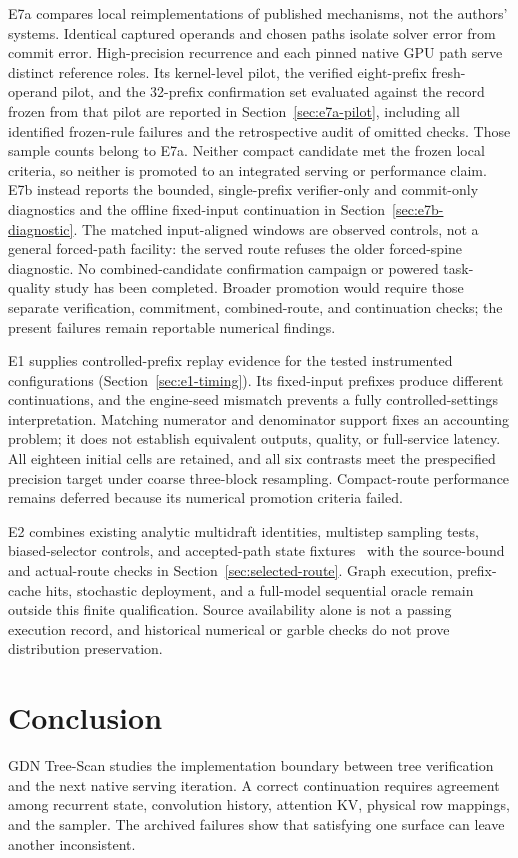 \documentclass[conference]{IEEEtran}
\newcommand{\sys}{GDN Tree-Scan}
\begin{document}
E7a compares local reimplementations of published mechanisms, not the authors' systems. Identical captured operands and chosen paths isolate solver error from commit error. High-precision recurrence and each pinned native GPU path serve distinct reference roles. Its kernel-level pilot, the verified eight-prefix fresh-operand pilot, and the 32-prefix confirmation set evaluated against the record frozen from that pilot are reported in Section~\ref{sec:e7a-pilot}, including all identified frozen-rule failures and the retrospective audit of omitted checks. Those sample counts belong to E7a. Neither compact candidate met the frozen local criteria, so neither is promoted to an integrated serving or performance claim. E7b instead reports the bounded, single-prefix verifier-only and commit-only diagnostics and the offline fixed-input continuation in Section~\ref{sec:e7b-diagnostic}. The matched input-aligned windows are observed controls, not a general forced-path facility: the served route refuses the older forced-spine diagnostic. No combined-candidate confirmation campaign or powered task-quality study has been completed. Broader promotion would require those separate verification, commitment, combined-route, and continuation checks; the present failures remain reportable numerical findings.

E1 supplies controlled-prefix replay evidence for the tested instrumented configurations (Section~\ref{sec:e1-timing}). Its fixed-input prefixes produce different continuations, and the engine-seed mismatch prevents a fully controlled-settings interpretation. Matching numerator and denominator support fixes an accounting problem; it does not establish equivalent outputs, quality, or full-service latency. All eighteen initial cells are retained, and all six contrasts meet the prespecified precision target under coarse three-block resampling. Compact-route performance remains deferred because its numerical promotion criteria failed.

E2 combines existing analytic multidraft identities, multistep sampling tests, biased-selector controls, and accepted-path state fixtures~\cite{lumo2026archive} with the source-bound and actual-route checks in Section~\ref{sec:selected-route}. Graph execution, prefix-cache hits, stochastic deployment, and a full-model sequential oracle remain outside this finite qualification. Source availability alone is not a passing execution record, and historical numerical or garble checks do not prove distribution preservation.

\section{Conclusion}
\sys{} studies the implementation boundary between tree verification and the next native serving iteration. A correct continuation requires agreement among recurrent state, convolution history, attention KV, physical row mappings, and the sampler. The archived failures show that satisfying one surface can leave another inconsistent.
\end{document}
